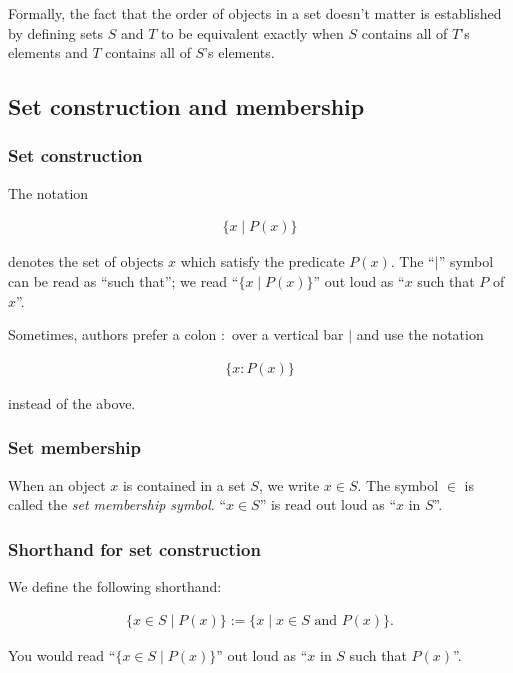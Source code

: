 Formally, the fact that the order of objects in a set doesn't matter is established by defining sets $S$ and $T$ to be equivalent exactly when $S$ contains all of $T$'s elements and $T$ contains all of $S$'s elements.

\subsection*{Set construction and membership}

\subsubsection*{Set construction}

The notation

\begin{align*}
    \{ x \mid P(x) \}
\end{align*}

denotes the set of objects $x$ which satisfy the predicate $P(x)$. The ``$\mid$'' symbol can be read as ``such that''; we read ``$\{ x \mid P(x) \}$'' out loud as ``$x$ such that $P$ of $x$''. 

Sometimes, authors prefer a colon $:$ over a vertical bar $|$ and use the notation 

\begin{align*}
    \{ x : P(x) \}
\end{align*}

instead of the above.

\subsubsection*{Set membership}

When an object $x$ is contained in a set $S$, we write $x \in S$. The symbol $\in$ is called the \textit{set membership symbol}. ``$x \in S$'' is read out loud as ``$x$ in $S$''.

\subsubsection*{Shorthand for set construction}

We define the following shorthand:

\begin{align*}
    \{ x \in S \mid P(x)\} := \{ x \mid x \in S \text{ and } P(x)\}.
\end{align*}

You would read ``$\{ x \in S \mid P(x)\}$'' out loud as ``$x$ in $S$ such that $P(x)$''.

